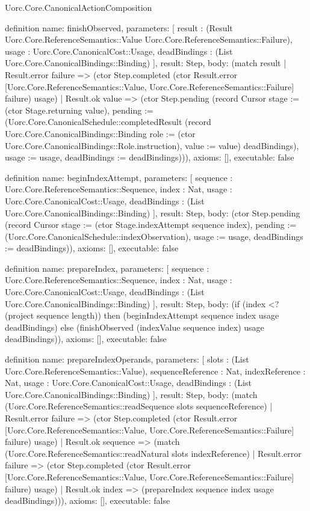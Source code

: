 \begin{lexlean}{Uorc.Core.CanonicalActionComposition}
\begin{semanticmodule}
definition{
  name: finishObserved,
  parameters: [
    result : (Result Uorc.Core.ReferenceSemantics::Value Uorc.Core.ReferenceSemantics::Failure),
    usage : Uorc.Core.CanonicalCost::Usage,
    deadBindings : (List Uorc.Core.CanonicalBindings::Binding)
  ],
  result: Step,
  body: (match result
    | Result.error failure => (ctor Step.completed (ctor Result.error [Uorc.Core.ReferenceSemantics::Value, Uorc.Core.ReferenceSemantics::Failure] failure) usage)
    | Result.ok value => (ctor Step.pending (record Cursor {stage := (ctor Stage.returning value), pending := (Uorc.Core.CanonicalSchedule::completedResult (record Uorc.Core.CanonicalBindings::Binding {role := (ctor Uorc.Core.CanonicalBindings::Role.instruction), value := value}) deadBindings), usage := usage, deadBindings := deadBindings}))),
  axioms: [],
  executable: false
}

definition{
  name: beginIndexAttempt,
  parameters: [
    sequence : Uorc.Core.ReferenceSemantics::Sequence,
    index : Nat,
    usage : Uorc.Core.CanonicalCost::Usage,
    deadBindings : (List Uorc.Core.CanonicalBindings::Binding)
  ],
  result: Step,
  body: (ctor Step.pending (record Cursor {stage := (ctor Stage.indexAttempt sequence index), pending := (Uorc.Core.CanonicalSchedule::indexObservation), usage := usage, deadBindings := deadBindings})),
  axioms: [],
  executable: false
}

definition{
  name: prepareIndex,
  parameters: [
    sequence : Uorc.Core.ReferenceSemantics::Sequence,
    index : Nat,
    usage : Uorc.Core.CanonicalCost::Usage,
    deadBindings : (List Uorc.Core.CanonicalBindings::Binding)
  ],
  result: Step,
  body: (if (index <? (project sequence length)) then (beginIndexAttempt sequence index usage deadBindings) else (finishObserved (indexValue sequence index) usage deadBindings)),
  axioms: [],
  executable: false
}

definition{
  name: prepareIndexOperands,
  parameters: [
    slots : (List Uorc.Core.ReferenceSemantics::Value),
    sequenceReference : Nat,
    indexReference : Nat,
    usage : Uorc.Core.CanonicalCost::Usage,
    deadBindings : (List Uorc.Core.CanonicalBindings::Binding)
  ],
  result: Step,
  body: (match (Uorc.Core.ReferenceSemantics::readSequence slots sequenceReference)
    | Result.error failure => (ctor Step.completed (ctor Result.error [Uorc.Core.ReferenceSemantics::Value, Uorc.Core.ReferenceSemantics::Failure] failure) usage)
    | Result.ok sequence => (match (Uorc.Core.ReferenceSemantics::readNatural slots indexReference)
      | Result.error failure => (ctor Step.completed (ctor Result.error [Uorc.Core.ReferenceSemantics::Value, Uorc.Core.ReferenceSemantics::Failure] failure) usage)
      | Result.ok index => (prepareIndex sequence index usage deadBindings))),
  axioms: [],
  executable: false
}


\end{semanticmodule}
\end{lexlean}
